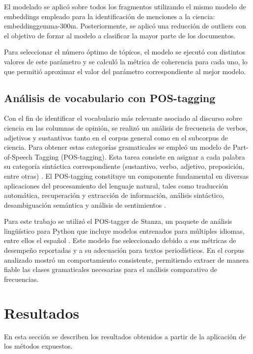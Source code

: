 \documentclass[11pt,a4paper]{article}
\begin{document}
	El modelado se aplicó sobre todos los fragmentos utilizando el mismo modelo de embeddings empleado para la identificación de menciones a la ciencia: embeddinggemma-300m. Posteriormente, se aplicó una reducción de outliers con el objetivo de forzar al modelo a clasificar la mayor parte de los documentos.
	
	Para seleccionar el número óptimo de tópicos, el modelo se ejecutó con distintos valores de este parámetro y se calculó la métrica de coherencia para cada uno, lo que permitió aproximar el valor del parámetro correspondiente al mejor modelo.
	
	\subsection{Análisis de vocabulario con POS-tagging}
	Con el fin de identificar el vocabulario más relevante asociado al discurso sobre ciencia en las columnas de opinión, se realizó un análisis de frecuencia de verbos, adjetivos y sustantivos tanto en el corpus general como en el subcorpus de ciencia. Para obtener estas categorías gramaticales se empleó un modelo de Part-of-Speech Tagging (POS-tagging). Esta tarea consiste en asignar a cada palabra su categoría sintáctica correspondiente (sustantivo, verbo, adjetivo, preposición, entre otras) \cite{he2020surveyrecentadvancessequence}. El POS-tagging constituye un componente fundamental en diversas aplicaciones del procesamiento del lenguaje natural, tales como traducción automática, recuperación y extracción de información, análisis sintáctico, desambiguación semántica y análisis de sentimientos \cite{Chiche2022}.
	
	Para este trabajo se utilizó el POS-tagger de Stanza, un paquete de análisis lingüístico para Python que incluye modelos entrenados para múltiples idiomas, entre ellos el español \cite{qi2020stanzapythonnaturallanguage}. Este modelo fue seleccionado debido a sus métricas de desempeño reportadas y a su adecuación para textos periodísticos. En el corpus analizado mostró un comportamiento consistente, permitiendo extraer de manera fiable las clases gramaticales necesarias para el análisis comparativo de frecuencias.
	
	\section{Resultados}
	En esta sección se describen los resultados obtenidos a partir de la aplicación de los métodos expuestos.
	
\end{document}
